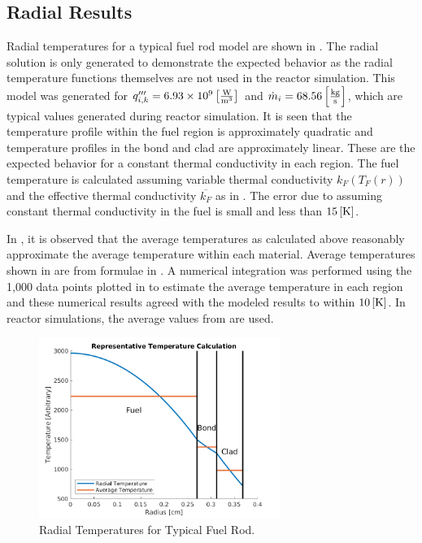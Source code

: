   \subsection{Radial Results}
    Radial temperatures for a typical fuel rod model are shown in
    . The radial solution is only generated to
    demonstrate the expected behavior as the radial temperature functions
    themselves are not used in the reactor simulation. This model was generated 
    for ${q'''_{i,k} = 6.93 \times 10^9 \left[\text{{$\frac{\text{W}}{\text{m}^3}$}}\right]}$ 
    and ${\dot{m}_i = 68.56 \left[\text{{$\frac{\text{kg}}{\text{s}}$}}\right]}$, which are 
    typical values generated during reactor simulation. It is seen
    that the temperature profile within the fuel region is approximately 
    quadratic and temperature profiles in the bond and clad are approximately
    linear. These are the expected behavior for a constant thermal conductivity
    in each region. The fuel temperature is calculated assuming variable thermal
    conductivity $k_F(T_F(r))$ and the effective thermal conductivity
    $\overline{k_F}$ as in . The error due to assuming
    constant thermal conductivity in the fuel is small and less than $15
    \left[\text{{K}}\right]$.

    In , it is observed that the average temperatures
    as calculated above reasonably approximate the average temperature within 
    each material. Average temperatures shown in  are
    from formulae in . A numerical integration was 
    performed using the 1,000 data points plotted in 
    to estimate the average temperature in each region and these numerical 
    results agreed with the modeled results to within $10 \left[\text{{K}}\right]$. In reactor 
    simulations, the average values from  are used.

    \begin{figure}
      \centering
      \includegraphics[width=0.7\textwidth]{radial_temp_plot}
      \caption{Radial Temperatures for Typical Fuel Rod.}
      \label{fig:radial_temp_plot}
    \end{figure}

